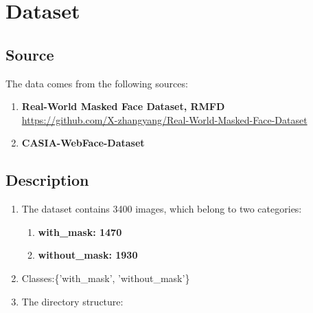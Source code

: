 \documentclass{article}
\begin{document}



\section{Dataset}

  \subsection{Source}
  The data comes from the following sources:
  \begin{enumerate}
    \item \textbf{Real-World Masked Face Dataset, RMFD}\\
          \url{https://github.com/X-zhangyang/Real-World-Masked-Face-Dataset}
    \item \textbf{CASIA-WebFace-Dataset}
  \end{enumerate}
  \subsection{Description}
  \begin{enumerate}
    \item The dataset contains 3400 images, which belong to two categories:
          \begin{enumerate}
            \item \textbf{with\_mask: 1470}
            \item \textbf{without\_mask: 1930}
          \end{enumerate}

    \item Classes:\{'with\_mask', 'without\_mask'\}
    
    \item The directory structure:
          \DTsetlength{0.2em}{1em}{0.2em}{1pt}{3pt}
  \end{enumerate}
\end{document}
